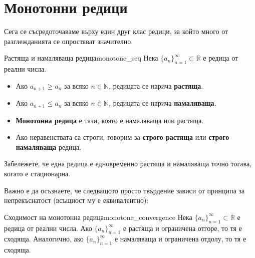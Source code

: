 \section{Монотонни редици}

Сега се съсредоточаваме върху един друг клас редици, за който много от разглежданията се опростяват значително.

\begin{definition}{Растяща и намаляваща редица}{monotone_seq}
Нека $\{a_n\}_{n=1}^{\infty} \subset \mathbb{R}$ е редица от реални числа.
\begin{itemize}
    \item Ако $a_{n+1} \ge a_n$ за всяко $n \in \mathbb{N}$, редицата се нарича \textbf{растяща}.
    \item Ако $a_{n+1} \le a_n$ за всяко $n \in \mathbb{N}$, редицата се нарича \textbf{намаляваща}.
    \item \textbf{Монотонна редица} е тази, която е намаляваща или растяща.
    \item Ако неравенствата са строги, говорим за \textbf{строго растяща} или \textbf{строго намаляваща} редица.
\end{itemize}
Забележете, че една редица е едновременно растяща и намаляваща точно тогава, когато е стационарна.
\end{definition}

Важно е да осъзнаете, че следващото просто твърдение зависи от принципа за непрекъснатост (всъщност му е еквивалентно):

\begin{theorem}{Сходимост на монотонна редица}{monotone_convergence}
Нека $\{a_n\}_{n=1}^{\infty} \subset \mathbb{R}$ е редица от реални числа. Ако $\{a_n\}_{n=1}^{\infty}$ е растяща и ограничена отгоре, то тя е сходяща. Аналогично, ако $\{a_n\}_{n=1}^{\infty}$ е намаляваща и ограничена отдолу, то тя е сходяща.
\end{theorem}

